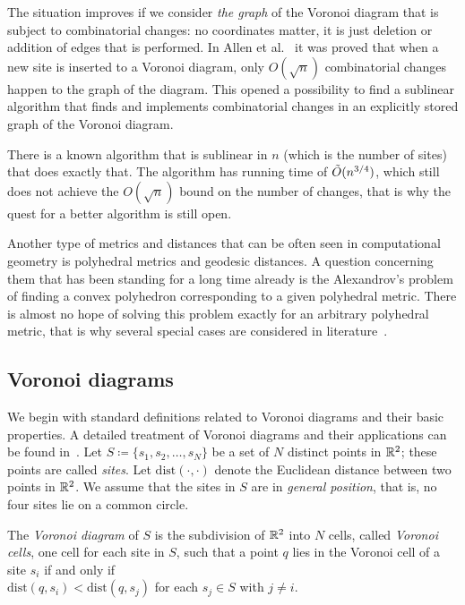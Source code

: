 \documentclass[a4paper,11pt]{article}
\begin{document}
The situation improves if we consider {\itshape the graph} of the Voronoi diagram that is subject to combinatorial changes: no coordinates matter, it is just deletion or addition of edges that is performed. In Allen et al.~\cite{DBLP:journals/dcg/AllenBIL17} it was proved that when a new site is inserted to a Voronoi diagram, only $O(\sqrt{n})$ combinatorial changes happen to the graph of the diagram. This opened a possibility to find a sublinear algorithm that finds and implements combinatorial changes in an explicitly stored graph of the Voronoi diagram.

There is a known algorithm that is sublinear in $n$ (which is the number of sites) that does exactly that. The algorithm has running time of $\tilde{O} (n^{3/4})$, which still does not achieve the $O(\sqrt{n})$ bound on the number of changes, that is why the quest for a better algorithm is still open.

Another type of metrics and distances that can be often seen in computational geometry is polyhedral metrics and geodesic distances. A question concerning them that has been standing for a long time already is the Alexandrov's problem of finding a convex polyhedron corresponding to a given polyhedral metric. There is almost no hope of solving this problem exactly for an arbitrary polyhedral metric, that is why several special cases are considered in literature~\cite{ddlop99,DO07,DDLO02,kl17-hex,alz-penta-jip}. 

\subsection{Voronoi diagrams}

We begin with standard definitions related to Voronoi diagrams and their basic properties. A detailed treatment of Voronoi diagrams and their applications can be found in~\cite{aklvd}. Let $S \coloneqq \{s_1, s_2, \ldots, s_N\}$ be a set of $N$ distinct points in $\mathbb R^2$; these points are called \emph{sites}. Let $\mathrm{dist} (\cdot, \cdot)$ denote the Euclidean distance between two points in  $\mathbb R^2$. We assume that the sites in $S$ are in {\itshape general position}, that is, no four sites lie on a common circle.

\begin{definition} The \emph{Voronoi diagram} of $S$ is the subdivision of $\mathbb R^2$ into $N$ {cells}, called \emph{Voronoi cells}, one cell for each site in $S$, such that a point $q$ lies in the Voronoi cell of a site $s_i$ if and only if \\
$\mathrm{dist} (q, s_i) < \mathrm{dist} (q, s_j)$ for each $s_j \in S$ with $j \ne i$. 
\end{definition}
\end{document}
